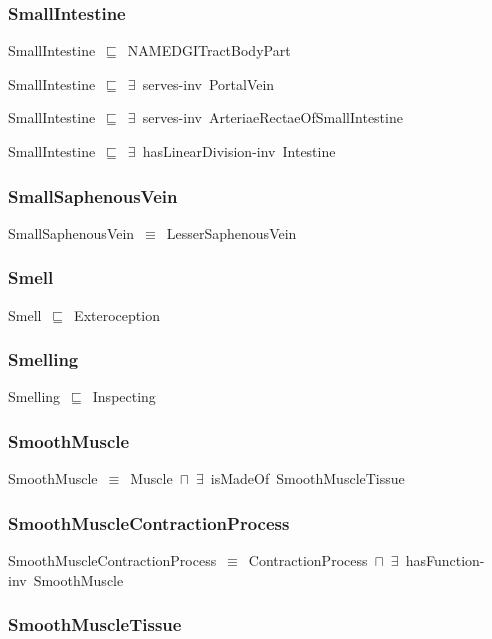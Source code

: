 \documentclass{article}
\begin{document}
\subsubsection*{SmallIntestine}

SmallIntestine~\ensuremath{\sqsubseteq}~NAMEDGITractBodyPart~

SmallIntestine~\ensuremath{\sqsubseteq}~\ensuremath{\exists}~serves-inv~PortalVein~

SmallIntestine~\ensuremath{\sqsubseteq}~\ensuremath{\exists}~serves-inv~ArteriaeRectaeOfSmallIntestine~

SmallIntestine~\ensuremath{\sqsubseteq}~\ensuremath{\exists}~hasLinearDivision-inv~Intestine~

\subsubsection*{SmallSaphenousVein}

SmallSaphenousVein~\ensuremath{\equiv}~LesserSaphenousVein

\subsubsection*{Smell}

Smell~\ensuremath{\sqsubseteq}~Exteroception~

\subsubsection*{Smelling}

Smelling~\ensuremath{\sqsubseteq}~Inspecting~

\subsubsection*{SmoothMuscle}

SmoothMuscle~\ensuremath{\equiv}~Muscle~\ensuremath{\sqcap}~\ensuremath{\exists}~isMadeOf~SmoothMuscleTissue

\subsubsection*{SmoothMuscleContractionProcess}

SmoothMuscleContractionProcess~\ensuremath{\equiv}~ContractionProcess~\ensuremath{\sqcap}~\ensuremath{\exists}~hasFunction-inv~SmoothMuscle

\subsubsection*{SmoothMuscleTissue}
\end{document}
